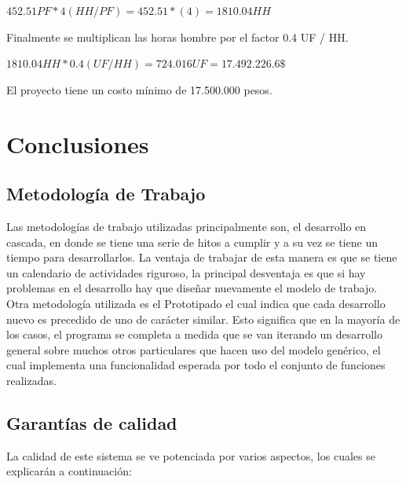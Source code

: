 \documentclass[a4paper,12pt,openany,oneside]{book}
\begin{document}
\begin{math}
452.51 PF * 4 (HH / PF) = 452.51 * (4) = 1810.04 HH
\end{math}

Finalmente se multiplican las horas hombre por el factor 0.4 UF / HH.

\begin{math}
1810.04 HH * 0.4(UF / HH) = 724.016 UF = 17.492.226.6 \$
\end{math}

El proyecto tiene un costo mínimo de 17.500.000 pesos.

\chapter{Conclusiones}

\section{Metodología de Trabajo}
Las metodologías de trabajo utilizadas principalmente son, el desarrollo en cascada, en donde se tiene una serie de hitos a cumplir y a su vez se tiene un tiempo para desarrollarlos. La ventaja de trabajar de esta manera es que se tiene un calendario de actividades riguroso, la principal desventaja es que si hay problemas en el desarrollo hay que diseñar nuevamente el modelo de trabajo. Otra metodología utilizada es el Prototipado el cual indica que cada desarrollo nuevo es precedido de uno de carácter similar. Esto significa que en la mayoría de los casos, el programa se completa a medida que se van iterando un desarrollo general sobre muchos otros particulares que hacen uso del modelo genérico, el cual implementa una funcionalidad esperada por todo el conjunto de funciones realizadas.

\section{Garantías de calidad}
La calidad de este sistema se ve potenciada por varios aspectos, los cuales se explicarán a continuación:
\end{document}
